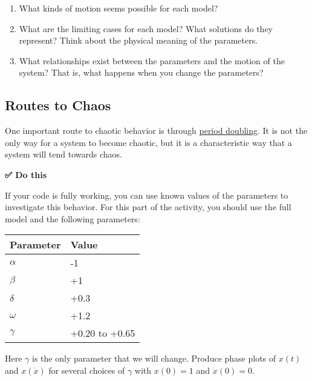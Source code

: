 \begin{enumerate}
\def\labelenumi{\arabic{enumi}.}
\tightlist
\item
  What kinds of motion seems possible for each model?
\item
  What are the limiting cases for each model? What solutions do they
  represent? Think about the physical meaning of the parameters.
\item
  What relationships exist between the parameters and the motion of the
  system? That is, what happens when you change the parameters?
\end{enumerate}

\begin{Shaded}
\begin{Highlighting}[]

\end{Highlighting}
\end{Shaded}

\begin{Shaded}
\begin{Highlighting}[]
\end{Highlighting}
\end{Shaded}

\subsection{Routes to Chaos}\label{routes-to-chaos}

One important route to chaotic behavior is through
\href{https://en.wikipedia.org/wiki/Period-doubling_bifurcation}{period
doubling}. It is not the only way for a system to become chaotic, but it
is a characteristic way that a system will tend towards chaos.

\textbf{✅ Do this}

If your code is fully working, you can use known values of the
parameters to investigate this behavior. For this part of the activity,
you should use the full model and the following parameters:

\begin{longtable}[]{@{}ll@{}}
\toprule\noalign{}
Parameter & Value \\
\midrule\noalign{}
\endhead
\bottomrule\noalign{}
\endlastfoot
\(\alpha\) & -1 \\
\(\beta\) & +1 \\
\(\delta\) & +0.3 \\
\(\omega\) & +1.2 \\
\(\gamma\) & +0.20 to +0.65 \\
\end{longtable}

Here \(\gamma\) is the only parameter that we will change. Produce phase
plots of \(x(t)\) and \(x(\dot{x})\) for several choices of \(\gamma\)
with \(x(0) = 1\) and \(\dot{x}(0) = 0\).
